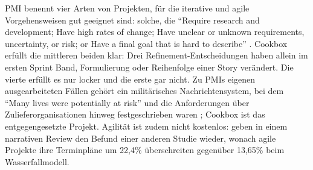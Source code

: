 PMI benennt vier Arten von Projekten, für die iterative und agile Vorgehensweisen
gut geeignet sind: solche, die \enquote{Require research and development; Have high rates of
change; Have unclear or unknown requirements, uncertainty, or risk; or Have a
final goal that is hard to describe} \parencite[p.~16]{pmi2017}. Cookbox erfüllt
die mittleren beiden klar: Drei Refinement-Entscheidungen haben allein im ersten
Sprint Band, Formulierung oder Reihenfolge einer Story verändert. Die vierte
erfüllt es nur locker und die erste gar nicht. Zu PMIs eigenen ausgearbeiteten
Fällen gehört ein militärisches Nachrichtensystem, bei dem \enquote{Many lives
were potentially at risk} und die Anforderungen über Zulieferorganisationen
hinweg festgeschrieben waren
\parencite[p.~138]{pmi2017}; Cookbox ist das entgegengesetzte Projekt. Agilität
ist zudem nicht kostenlos: \textcite[p.~1516]{mishra2023} geben in einem
narrativen Review den Befund einer anderen Studie wieder, wonach agile Projekte
ihre Terminpläne um 22,4\% überschreiten gegenüber 13,65\% beim Wasserfallmodell.


